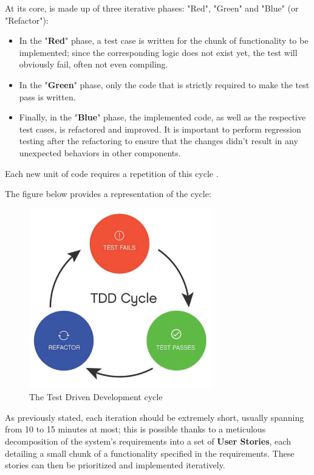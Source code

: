 At its core, \tdd is made up of three iterative phases: "Red", "Green" and "Blue" (or "Refactor"):
\begin{itemize}
    \item In the "\textbf{Red}" phase, a test case is written for the chunk of functionality to be implemented; since the corresponding logic does not exist yet, the test will obviously fail, often not even compiling.
    \item In the "\textbf{Green}" phase, only the code that is strictly required to make the test pass is written.
    \item Finally, in the "\textbf{Blue}" phase, the implemented code, as well as the respective test cases, is refactored and improved. It is important to perform regression testing after the refactoring to ensure that the changes didn't result in any unexpected behaviors in other components.
\end{itemize}
Each new unit of code requires a repetition of this cycle \cite{GuidelinesTDD}.

The figure below provides a representation of the \tdd cycle:
\begin{figure}[h]
    \centering
    \includegraphics[width=8cm, scale=0.2]{figures/tdd_cycle.jpg}
    \caption{The Test Driven Development cycle}
    \label{tdd-cycle}
\end{figure}

As previously stated, each \tdd iteration should be extremely short, usually spanning from 10 to 15 minutes at most; this is possible thanks to a meticulous decomposition of the system's requirements into a set of \textbf{User Stories}, each detailing a small chunk of a functionality specified in the requirements. These stories can then be prioritized and implemented iteratively.


